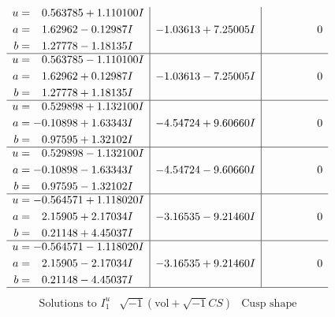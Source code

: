 \documentclass[1p]{elsarticle_modified}
\theoremstyle{definition}
\newcommand{\I}{\sqrt{-1}}
\begin{document}
$$\begin{array}{c|c|c}
\begin{aligned}
u &= \phantom{-}0.563785 + 1.110100 I \\
a &= \phantom{-}1.62962 - 0.12987 I \\
b &= \phantom{-}1.27778 - 1.18135 I\end{aligned}
 & -1.03613 + 7.25005 I & \phantom{-0.000000 } 0 \\ \hline\begin{aligned}
u &= \phantom{-}0.563785 - 1.110100 I \\
a &= \phantom{-}1.62962 + 0.12987 I \\
b &= \phantom{-}1.27778 + 1.18135 I\end{aligned}
 & -1.03613 - 7.25005 I & \phantom{-0.000000 } 0 \\ \hline\begin{aligned}
u &= \phantom{-}0.529898 + 1.132100 I \\
a &= -0.10898 + 1.63343 I \\
b &= \phantom{-}0.97595 + 1.32102 I\end{aligned}
 & -4.54724 + 9.60660 I & \phantom{-0.000000 } 0 \\ \hline\begin{aligned}
u &= \phantom{-}0.529898 - 1.132100 I \\
a &= -0.10898 - 1.63343 I \\
b &= \phantom{-}0.97595 - 1.32102 I\end{aligned}
 & -4.54724 - 9.60660 I & \phantom{-0.000000 } 0 \\ \hline\begin{aligned}
u &= -0.564571 + 1.118020 I \\
a &= \phantom{-}2.15905 + 2.17034 I \\
b &= \phantom{-}0.21148 + 4.45037 I\end{aligned}
 & -3.16535 - 9.21460 I & \phantom{-0.000000 } 0 \\ \hline\begin{aligned}
u &= -0.564571 - 1.118020 I \\
a &= \phantom{-}2.15905 - 2.17034 I \\
b &= \phantom{-}0.21148 - 4.45037 I\end{aligned}
 & -3.16535 + 9.21460 I & \phantom{-0.000000 } 0\\
 \hline 
 \end{array}$$\newpage$$\begin{array}{c|c|c}  
\text{Solutions to }I^u_{1}& \I (\text{vol} + \sqrt{-1}CS) & \text{Cusp shape}\\
 \hline 
\begin{aligned}

\end{aligned}
\end{array}$$
\end{document}

